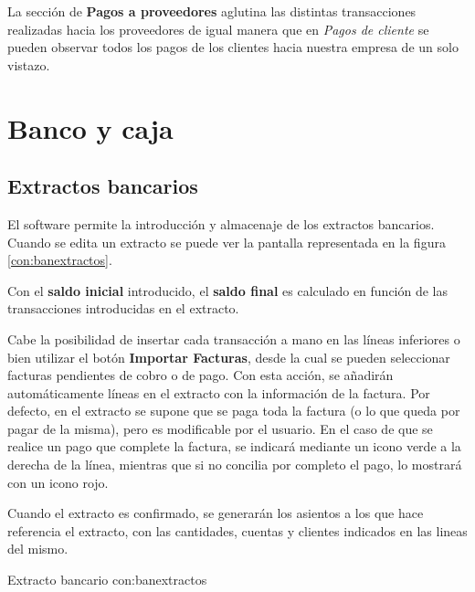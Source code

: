 La sección de \textbf{Pagos a proveedores} aglutina las distintas transacciones realizadas hacia los proveedores de igual manera que en \emph{Pagos de cliente} se pueden observar todos los pagos de los clientes hacia nuestra empresa de un solo vistazo.








\section{Banco y caja}
\subsection{Extractos bancarios}
El software permite la introducción y almacenaje de los extractos bancarios. Cuando se edita un extracto se puede ver la pantalla
representada en la figura \ref{con:banextractos}.

Con el \textbf{saldo inicial} introducido, el \textbf{saldo final} es calculado en función de las transacciones introducidas en el 
extracto.

Cabe la posibilidad de insertar cada transacción a mano en las líneas inferiores o bien utilizar el botón \textbf{Importar Facturas}, desde la cual se pueden seleccionar facturas pendientes de cobro o de pago. Con esta acción, se añadirán automáticamente líneas en el extracto con la información de la factura. Por defecto, en el extracto se supone que se paga toda la factura (o lo que queda por pagar de la misma), pero es modificable por el usuario. En el caso de que se realice un pago que complete la factura, se indicará mediante un icono verde a la derecha de la línea, mientras que si no concilia por completo el pago, lo mostrará con un icono rojo.

Cuando el extracto es confirmado, se generarán los asientos a los que hace referencia el extracto, con las cantidades, cuentas y clientes indicados en las lineas del mismo.

{Extracto bancario}
{con:banextractos}










